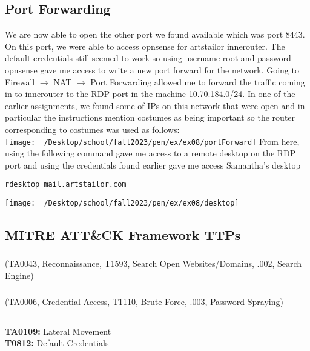 \documentclass[notitlepage]{article}
\begin{document}
    \subsection{Port Forwarding}
    We are now able to open the other port we found available which was port 8443. On this port, we were able to access opnsense for artstailor innerouter. The default credentials still 
    seemed to work so using username root and password opnsense gave me access to write a new port forward for the network. Going to Firewall $\rightarrow$ NAT $\rightarrow$ Port Forwarding allowed me to forward
    the traffic coming in to innerouter to the RDP port in the machine 10.70.184.0/24. In one of the earlier assignments, we found some of IPs on this network that were open and in particular 
    the instructions mention costumes as being important so the router corresponding to costumes was used as follows: \\
\texttt{[image: ~/Desktop/school/fall2023/pen/ex/ex08/portForward]}
    From here, using the following command gave me access to a remote desktop on the RDP port and using the credentials found earlier gave me access Samantha's desktop
    \begin{verbatim}
rdesktop mail.artstailor.com
    \end{verbatim}
\texttt{[image: ~/Desktop/school/fall2023/pen/ex/ex08/desktop]} \\

    \subsection{MITRE ATT{\&}CK Framework TTPs}
    \subsubsection*{}
    \ttp(TA0043, Reconnaissance, T1593, Search Open Websites/Domains, .002, Search Engine)
    
    \subsubsection*{}
    \ttp(TA0006, Credential Access, T1110, Brute Force, .003, Password Spraying)
    
    \subsection*{}
    \indent\textbf{TA0109:} Lateral Movement\\
    \indent\indent\textbf{T0812:} Default Credentials \\
\end{document}
